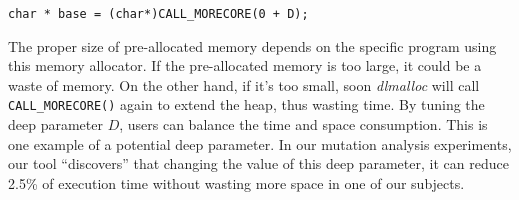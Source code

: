 \begin{lstlisting}
char * base = (char*)CALL_MORECORE(0 + D);
\end{lstlisting}

The proper size of pre-allocated memory depends on the specific program using this memory allocator. If the pre-allocated memory is too large, it could be a waste of memory. On the other hand, if it's too small, soon \emph{dlmalloc} will call {\tt CALL\_MORECORE()} again to extend the heap, thus wasting time. By tuning the deep parameter $D$, users can balance the time and space consumption. This is one example of a potential deep parameter. In our mutation analysis experiments, our tool ``discovers'' that changing the value of this deep parameter, it can reduce 2.5\% of execution time without wasting more space in one of our subjects.

